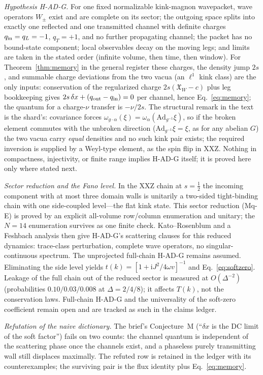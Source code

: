 \documentclass[aps,prl,twocolumn,superscriptaddress,longbibliography,floatfix]{revtex4-2}
\newcommand{\ic}{\ensuremath{\mathrm{i}}}
\begin{document}
\emph{Hypothesis H-AD-G.} For one fixed normalizable kink-magnon
wavepacket, wave operators $W_\pm$ exist and are complete on its sector;
the outgoing space
splits into exactly one reflected and one transmitted channel with definite
charges $q_{\rm in}=q_L=-1$, $q_T=+1$, and no further propagating channel;
the packet has no bound-state component; local observables decay on the
moving legs; and limits are taken in the stated order (infinite volume,
then time, then window). For Theorem~\ref{thm:memory} in the general
register these charges, the density jump $2s$, and summable charge
deviations from the two vacua (an $\ell^1$ kink class) are the only inputs:
conservation of the regularized charge $2s(\mathfrak{X}_W-c)$ plus leg
bookkeeping gives $2s\,\delta x+(q_{\rm out}-q_{\rm in})=0$ per channel,
hence Eq.~\eqref{eq:memory}; the quantum for a charge-$\nu$ transfer is
$-\nu/2s$. The structural remark in the text is the shard's: covariance forces
$\omega_{g\cdot\alpha}(\xi)=\omega_\alpha(\mathrm{Ad}_{g^{-1}}\xi)$, so if
the broken element commutes with the unbroken direction
($\mathrm{Ad}_{g^{-1}}\xi=\xi$, as for any abelian $G$) the two vacua carry
\emph{equal} densities and no such kink pair exists; the required inversion
is supplied by a Weyl-type element, as the spin flip in XXZ. Nothing in compactness, injectivity, or finite range implies
H-AD-G itself; it is proved here only where stated next.

\emph{Sector reduction and the Fano level.} In the XXZ chain at $s=\frac12$
the incoming component with at most three domain walls is unitarily a
two-sided tight-binding chain with one side-coupled level---the flat kink
state.  This sector reduction (Mq-E) is proved by an explicit all-volume
row/column enumeration and unitary; the $N=14$ enumeration survives as one
finite check.  Kato--Rosenblum and a Feshbach analysis then give H-AD-G's
scattering clauses for this reduced dynamics: trace-class perturbation,
complete wave operators, no singular-continuous spectrum.  The unprojected
full-chain H-AD-G remains assumed. Eliminating the side level
yields $t(k)=[1+\ic J^2/4\omega v]^{-1}$ and Eq.~\eqref{eq:softzero}.
Leakage of the full chain out of the reduced sector is measured at
$O(\Delta^{-2})$ (probabilities $0.10/0.03/0.008$ at $\Delta=2/4/8$); it
affects $T(k)$, not the conservation laws. Full-chain H-AD-G and the
universality of the soft-zero coefficient remain open and are tracked as
such in the claims ledger.

\emph{Refutation of the naive dictionary.} The brief's Conjecture~M
(``$\delta x$ is the DC limit of the soft factor'') fails on two counts:
the channel quantum is independent of the scattering phase once the
channels exist, and a phaseless purely transmitting wall still displaces
maximally. The refuted row is retained in the ledger with its
counterexamples; the surviving pair is the flux identity plus
Eq.~\eqref{eq:memory}.
\end{document}
